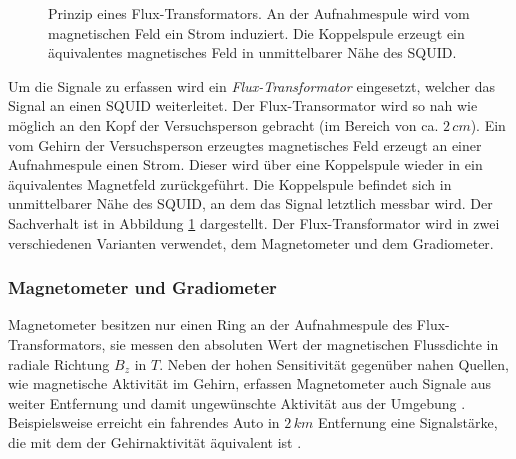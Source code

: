 \documentclass[doc,a4paper,12pt]{apa6}
\begin{document}
\begin{figure}[t]
  \centering
  \setlength{\fboxsep}{8mm}
  \vspace*{3mm}
  \caption[Prinzip eines Flux-Transformators]{Prinzip eines Flux-Transformators. An der Aufnahmespule wird vom magnetischen Feld ein Strom induziert. Die Koppelspule erzeugt ein äquivalentes magnetisches Feld in unmittelbarer Nähe des SQUID.}
  \label{img:flux-trafo}
\end{figure}

Um die Signale zu erfassen wird ein \emph{Flux-Transformator} eingesetzt, welcher das Signal an einen SQUID weiterleitet. Der Flux-Transormator wird so nah wie möglich an den Kopf der Versuchsperson gebracht (im Bereich von ca. $2\,cm$). Ein vom Gehirn der Versuchsperson erzeugtes magnetisches Feld erzeugt an einer Aufnahmespule einen Strom. Dieser wird über eine Koppelspule wieder in ein äquivalentes Magnetfeld zurückgeführt. Die Koppelspule befindet sich in unmittelbarer Nähe des SQUID, an dem das Signal letztlich messbar wird. Der Sachverhalt ist in Abbildung \ref{img:flux-trafo} dargestellt. Der Flux-Transformator wird in zwei verschiedenen Varianten verwendet, dem Magnetometer und dem Gradiometer.

\subsubsection{Magnetometer und Gradiometer}

Magnetometer besitzen nur einen Ring an der Aufnahmespule des Flux-Transformators, sie messen den absoluten Wert der magnetischen Flussdichte in radiale Richtung $B_z$ in $T$. Neben der hohen Sensitivität gegenüber nahen Quellen, wie magnetische Aktivität im Gehirn, erfassen Magnetometer auch Signale aus weiter Entfernung und damit ungewünschte Aktivität aus der Umgebung \parencite{hansen2010meg}. Beispielsweise erreicht ein fahrendes Auto in $2\,km$ Entfernung eine Signalstärke, die mit dem der Gehirnaktivität äquivalent ist \parencite{weinstock2012squid}.
\end{document}

